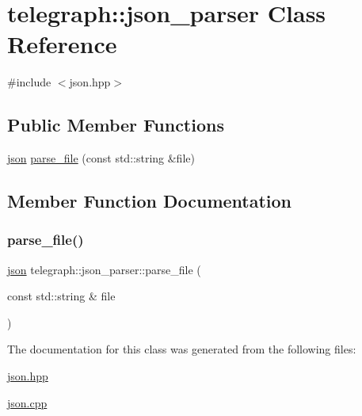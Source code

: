 \hypertarget{classtelegraph_1_1json__parser}{}\section{telegraph\+:\+:json\+\_\+parser Class Reference}
\label{classtelegraph_1_1json__parser}


{\ttfamily \#include $<$json.\+hpp$>$}

\subsection*{Public Member Functions}
\begin{DoxyCompactItemize}
\item 
\hyperlink{namespacetelegraph_ab87b47a6b955c365ddd74c343ecc16f4}{json} \hyperlink{classtelegraph_1_1json__parser_ad3f209cfb4e81aa7c1d5fb577b09de30}{parse\+\_\+file} (const std\+::string \&file)
\end{DoxyCompactItemize}


\subsection{Member Function Documentation}
\mbox{\label{classtelegraph_1_1json__parser_ad3f209cfb4e81aa7c1d5fb577b09de30}} 
\subsubsection{\texorpdfstring{parse\+\_\+file()}{parse\_file()}}
{\footnotesize\ttfamily \hyperlink{namespacetelegraph_ab87b47a6b955c365ddd74c343ecc16f4}{json} telegraph\+::json\+\_\+parser\+::parse\+\_\+file (\begin{DoxyParamCaption}\item[{const std\+::string \&}]{file }\end{DoxyParamCaption})}



The documentation for this class was generated from the following files\+:\begin{DoxyCompactItemize}
\item 
\hyperlink{json_8hpp}{json.\+hpp}\item 
\hyperlink{json_8cpp}{json.\+cpp}\end{DoxyCompactItemize}
